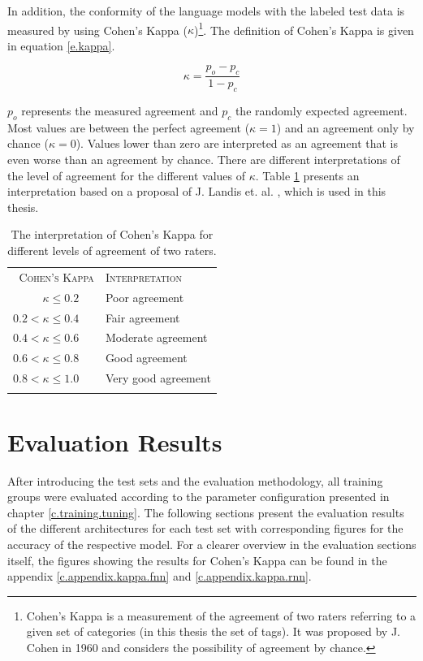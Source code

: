 In addition, the conformity of the language models with the labeled test data is measured by using Cohen's Kappa ($\kappa$)\footnote{Cohen's Kappa is a measurement of the agreement of two raters referring to a given set of categories (in this thesis the set of tags). It was proposed by J. Cohen in 1960 \cite{cohen1960} and considers the possibility of agreement by chance.}. The definition of Cohen's Kappa is given in equation \ref{e.kappa}.

\begin{equation}
\kappa = \frac{p_o - p_c}{1 - p_c} \label{e.kappa}
\end{equation}

$p_o$ represents the measured agreement and $p_c$ the randomly expected agreement. Most values are between the perfect agreement ($\kappa = 1$) and an agreement only by chance ($\kappa = 0$). Values lower than zero are interpreted as an agreement that is even worse than an agreement by chance. There are different interpretations of the level of agreement for the different values of $\kappa$. Table \ref{t.evaluation.kappa} presents an interpretation based on a proposal of J. Landis et. al. \cite{landis1977}, which is used in this thesis.

\begin{table}[!ht]
	\centering\small{}\begin{tabular}{ r l }
	\trule
	\textsc{Cohen's Kappa} & \textsc{Interpretation} \\
	\srule
	$\kappa \leq 0.2$ \ \ & Poor agreement \\
	\mrule
	$0.2 < \kappa \leq 0.4$ \ \ & Fair agreement \\
	\mrule
	$0.4 < \kappa \leq 0.6$ \ \ & Moderate agreement \\
	\mrule
	$0.6 < \kappa \leq 0.8$ \ \ & Good agreement \\
	\mrule
	$0.8 < \kappa \leq 1.0$ \ \ & Very good agreement \\
	\brule
	\end{tabular}
	\vspace{.8em}
	\caption[Interpretation of Cohen's Kappa]{The interpretation of Cohen's Kappa for different levels of agreement of two raters.}
	\label{t.evaluation.kappa}
\end{table}

\section{Evaluation Results}\label{c.evaluation.results}
After introducing the test sets and the evaluation methodology, all training groups were evaluated according to the parameter configuration presented in chapter \ref{c.training.tuning}. The following sections present the evaluation results of the different architectures for each test set with corresponding figures for the accuracy of the respective model. For a clearer overview in the evaluation sections itself, the figures showing the results for Cohen's Kappa can be found in the appendix \ref{c.appendix.kappa.fnn} and \ref{c.appendix.kappa.rnn}.

